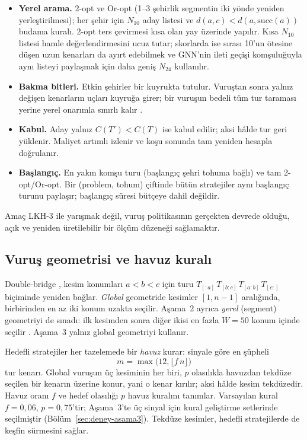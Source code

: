 \begin{itemize}
  \item \textbf{Yerel arama.} 2-opt ve Or-opt (1--3 şehirlik segmentin iki yönde yeniden
  yerleştirilmesi); her şehir için $N_{10}$ aday listesi ve $d(a,c)<d(a,\mathrm{succ}(a))$ budama
  kuralı. 2-opt ters çevirmesi kısa olan yay üzerinde yapılır. Kısa $N_{10}$ listesi hamle
  değerlendirmesini ucuz tutar; skorlarda ise sırası 10'un ötesine düşen uzun kenarları da
  ayırt edebilmek ve GNN'nin ileti geçişi komşuluğuyla aynı listeyi paylaşmak için daha geniş
  $N_{24}$ kullanılır.
  \item \textbf{Bakma bitleri.} Etkin şehirler bir kuyrukta tutulur. Vuruştan sonra yalnız değişen
  kenarların uçları kuyruğa girer; bir vuruşun bedeli tüm tur taraması yerine yerel onarımla
  sınırlı kalır \citep{bentley_1992_fast}.
  \item \textbf{Kabul.} Aday yalnız $C(T')<C(T)$ ise kabul edilir; aksi hâlde tur geri yüklenir.
  Maliyet artımlı izlenir ve koşu sonunda tam yeniden hesapla doğrulanır.
  \item \textbf{Başlangıç.} En yakın komşu turu (başlangıç şehri tohuma bağlı) ve tam 2-opt/Or-opt.
  Bir (problem, tohum) çiftinde bütün stratejiler aynı başlangıç turunu paylaşır; başlangıç süresi
  bütçeye dahil değildir.
\end{itemize}

Amaç LKH-3 ile yarışmak değil, vuruş politikasının gerçekten devrede olduğu, açık ve yeniden
üretilebilir bir ölçüm düzeneği sağlamaktır.

\subsection{Vuruş geometrisi ve havuz kuralı}\label{sec:yontem-kick}

Double-bridge \citep{martin_1992_largestep, lourenco_2010_ils}, kesim konumları $a<b<c$ için turu
$T_{[:a]}\,T_{[b:c]}\,T_{[a:b]}\,T_{[c:]}$ biçiminde yeniden bağlar. \emph{Global} geometride
kesimler $[1,n-1]$ aralığında, birbirinden en az iki konum uzakta seçilir. Aşama~2 ayrıca
\emph{yerel} (segment) geometriyi de sınadı: ilk kesimden sonra diğer ikisi en fazla $W=50$ konum
içinde seçilir \citep{applegate_2003_clk}. Aşama~3 yalnız global geometriyi kullanır.

Hedefli stratejiler her tazelemede bir \emph{havuz} kurar: sinyale göre en şüpheli
\[
  m=\max\bigl(12,\lfloor f\,n\rfloor\bigr)
\]
tur kenarı. Global vuruşun üç kesiminin her biri, $p$ olasılıkla havuzdan tekdüze seçilen bir
kenarın üzerine konur, yani o kenar kırılır; aksi hâlde kesim tekdüzedir. Havuz oranı $f$ ve hedef
olasılığı $p$ havuz kuralını tanımlar. Varsayılan kural $f=0{,}06$, $p=0{,}75$'tir; Aşama~3'te üç
sinyal için kural geliştirme setlerinde seçilmiştir (Bölüm~\ref{sec:deney-asama3}). Tekdüze
kesimler, hedefli stratejilerde de keşfin sürmesini sağlar.

